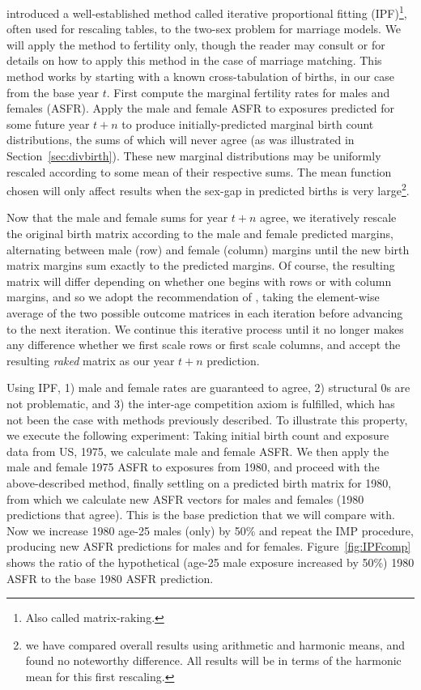 \FloatBarrier
\citet{mc1975models} introduced a well-established method called iterative
proportional fitting (IPF)\footnote{Also called matrix-raking.}, often used for
rescaling tables, to the two-sex problem for marriage models. We will apply
the method to fertility only, though the reader may consult
\citet{mc1975models} or \citet{Matthews2013} for details on how to apply
this method in the case of marriage matching. This method works by starting with
a known cross-tabulation of births, in our case from the base year $t$. First compute 
the marginal fertility rates for males and females (ASFR). Apply the male and
female ASFR to exposures predicted for some future year $t+n$ to produce
initially-predicted marginal birth count distributions, the sums of which will 
never agree (as was illustrated in Section~\ref{sec:divbirth}). These new
marginal distributions may be uniformly rescaled according to some mean of their
respective sums. The mean function chosen will only affect results when the
sex-gap in predicted births is very large\footnote{we have compared overall
results using arithmetic and harmonic means, and found no noteworthy difference. 
All results will be in terms of the harmonic mean for this first rescaling.}.

Now that the male and female sums for year $t+n$ agree, we iteratively
rescale the original birth matrix according to the male and female
predicted margins, alternating between male (row) and female (column) margins
until the new birth matrix margins sum exactly to the predicted margins. Of
course, the resulting matrix will differ depending on whether one begins with
rows or with column margins, and so we adopt the recommendation of
\citet{Matthews2013}, taking the element-wise average of the two
possible outcome matrices in each iteration before advancing to the next
iteration. We continue this iterative process until it no longer makes any
difference whether we first scale rows or first scale columns, and accept the
resulting \textit{raked} matrix as our year $t+n$ prediction.

Using IPF, 1) male and female rates are guaranteed to agree, 2) structural 0s
are not problematic, and 3) the inter-age competition axiom is fulfilled,
which has not been the case with methods previously described. To illustrate
this property, we execute the following experiment: Taking initial birth count
and exposure data from US, 1975, we calculate male and female ASFR. We then
apply the male and female 1975 ASFR to exposures from 1980, and proceed with the
above-described method, finally settling on a predicted birth matrix for 1980,
from which we calculate new ASFR vectors for males and females (1980
predictions that agree). This is the base prediction that we will compare with.
Now we increase 1980 age-25 males (only) by 50\% and repeat the IMP procedure,
producing new ASFR predictions for males and for females.
Figure~\ref{fig:IPFcomp} shows the ratio of the hypothetical (age-25 male
exposure increased by 50\%) 1980 ASFR to the base 1980 ASFR prediction.

